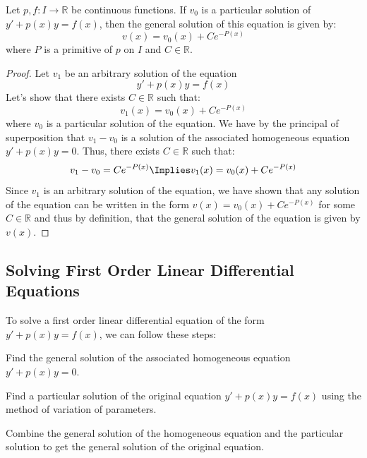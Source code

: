 \begin{theorem}
    Let $p,f: I \to \mathbb{R}$ be continuous functions. If $v_0$ is a particular solution of $y' + p(x)y = f(x)$, then the general solution of this equation is given by:
    \[
        v(x) = v_0(x) + Ce^{-P(x)}
    \]
    where $P$ is a primitive of $p$ on $I$ and $C \in \mathbb{R}$.
\end{theorem}
\begin{proof}
    Let $v_1$ be an arbitrary solution of the equation 
    \[
        y' + p(x)y = f(x)
    \] 
    Let's show that there exists $C \in \mathbb{R}$ such that:
    \[
        v_1(x) = v_0(x) + Ce^{-P(x)}
    \]
    where $v_0$ is a particular solution of the equation. We have by the principal of superposition that $v_1 - v_0$ is a solution of the associated homogeneous equation $y' + p(x) y = 0$. Thus, there exists $C \in \mathbb{R}$ such that: 
    \[
        v_1 - v_0 = Ce^{-P(x)} \Implies v_1(x) = v_0(x) + Ce^{-P(x)}
    \]
    Since $v_1$ is an arbitrary solution of the equation, we have shown that any solution of the equation can be written in the form $v(x) = v_0(x) + Ce^{-P(x)}$ for some $C \in \mathbb{R}$ and thus by definition, that the general solution of the equation is given by $v(x)$.
\end{proof}

\subsection{Solving First Order Linear Differential Equations}
To solve a first order linear differential equation of the form $y' + p(x) y = f(x)$, we can follow these steps:
\begin{citemize}
    \item Find the general solution of the associated homogeneous equation $y' + p(x) y = 0$.
    \item Find a particular solution of the original equation $y' + p(x) y = f(x)$ using the method of variation of parameters.
    \item Combine the general solution of the homogeneous equation and the particular solution to get the general solution of the original equation.
\end{citemize}

